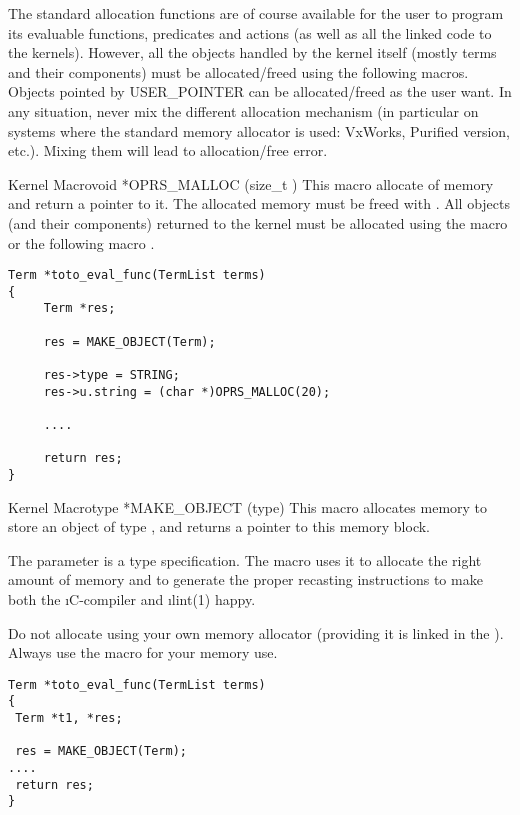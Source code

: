  The standard allocation functions are of
course available for the user to program its evaluable functions, predicates
and actions (as well as all the linked code to the kernels). However, all the
objects handled by the kernel itself (mostly terms and their components) must
be allocated/freed using the following macros. Objects pointed by USER\_POINTER
can be allocated/freed as the user want. In any situation, never mix the
different allocation mechanism (in particular on systems where the standard
memory allocator is used: VxWorks, Purified version, etc.). Mixing them will
lead to allocation/free error.

\begin{typefn}{Kernel Macro}{void *}{OPRS\_MALLOC} {(size\_t )}
This macro allocate  of memory and return a pointer to
it. The allocated memory must be freed with .  
All objects (and their components) returned to the kernel must be allocated
using the
 macro or the following macro .
\begin{verbatim}
Term *toto_eval_func(TermList terms)
{
     Term *res;

     res = MAKE_OBJECT(Term);

     res->type = STRING;
     res->u.string = (char *)OPRS_MALLOC(20);

     ....

     return res;
}
\end{verbatim}
\end{typefn}

\begin{typefn}{Kernel Macro}{type *}{MAKE\_OBJECT} {(type)}
This macro allocates memory to store an object of type , and
returns a pointer to this memory block.

The parameter is a type specification. The macro uses it to allocate
the right amount of memory and to generate the proper recasting
instructions to make both the \i{C}-compiler and \i{lint(1)} happy.

 Do not allocate using your own memory allocator
(providing it is linked in the \CPK). Always use the 
macro for your memory use.

\begin{verbatim}
Term *toto_eval_func(TermList terms)
{
 Term *t1, *res;

 res = MAKE_OBJECT(Term);
....
 return res;
}
\end{verbatim}
\end{typefn}

